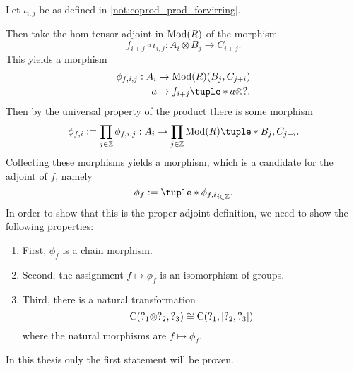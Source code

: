 \begin{remark}
\begin{center}
    \end{center}

    Let \( \iota_{i, j} \) be as defined in \autoref{not:coprod_prod_forvirring}.

    Then take the hom-tensor adjoint in \( \operatorname{Mod}(R) \) of the morphism
    \[
        f_{i + j} \circ \iota_{i, j}: A_i \otimes B_j \to C_{i + j}.
    \]
    This yields a morphism
    \begin{align*}
        \phi_{f, i, j}: A_i &\to \Mod(R)(B_j, C_{j + i}) \\
        a &\mapsto f_{i + j}\tuple*{ a \otimes ? }.
    \end{align*}
    Then by the universal property of the product there is some morphism
    \[
        \phi_{f, i} := \prod_{j \in \Zb} \phi_{f, i, j}: A_i \to \prod_{j \in \Zb} \Mod(R)\tuple*{B_j, C_{j + i}}.
    \]
    Collecting these morphisms yields a morphism, which is a candidate for the adjoint of \( f \), namely
    \[
        \phi_f := \tuple*{\phi_{f, i}}_{i \in \Zb}.
    \]
    In order to show that this is the proper adjoint definition, we need to show the following properties:
    \begin{enumerate}
        \item {
            First, \( \phi_f \) is a chain morphism.
        }
        \item {
            Second, the assignment \( f \mapsto \phi_f \) is an isomorphism of groups.
        }
        \item {
            Third, there is a natural transformation
            \[
                \operatorname{C}(?_1 \otimes ?_2, ?_3) \cong \operatorname{C}(?_1, \left[ ?_2, ?_3 \right])
            \]
            where the natural morphisms are \( f \mapsto \phi_f \).
        }
    \end{enumerate}
    In this thesis only the first statement will be proven.


\end{remark}
